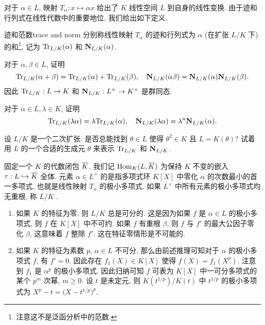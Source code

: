 对于 $\alpha\in L$, 映射 $T_\alpha:x\mapsto \alpha x$ 给出了 $K$ 线性空间 $L$ 到自身的线性变换.
由于迹和行列式在线性代数中的重要地位, 我们给出如下定义.

\begin{definition}{迹和范数}{trace and norm}
分别称线性映射 $T_\alpha$ 的迹和行列式为 $\alpha$ (在扩张 $L/K$ 下)的和\footnote{注意这不是泛函分析中的范数.}, 记为 ${\mathrm{Tr}}_{L/K}(\alpha)$ 和 ${\mathbf{N}}_{L/K}(\alpha)$.
\end{definition}

\begin{exercise}
对于 $\alpha,\beta\in L$, 证明
	\[{\mathrm{Tr}}_{L/K}(\alpha+\beta)={\mathrm{Tr}}_{L/K}(\alpha)+{\mathrm{Tr}}_{L/K}(\beta),\quad
	{\mathbf{N}}_{L/K}(\alpha\beta)={\mathbf{N}}_{L/K}(\alpha){\mathbf{N}}_{L/K}(\beta).\]
因此 ${\mathrm{Tr}}_{L/K}:L\to K$ 和 ${\mathbf{N}}_{L/K}:L^\times\to K^\times$ 是群同态.
\end{exercise}

\begin{exercise}
对于 $\alpha\in L,\lambda\in K$, 证明
	\[{\mathrm{Tr}}_{L/K}(\lambda\alpha)=\lambda{\mathrm{Tr}}_{L/K}(\alpha),\quad
	{\mathbf{N}}_{L/K}(\lambda\alpha)=\lambda^n{\mathbf{N}}_{L/K}(\alpha).\]
\end{exercise}

\begin{exercise}
设 $L/K$ 是一个二次扩张. 是否总能找到 $\theta\in L$ 使得 $\theta^2\in K$ 且 $L=K(\theta)$? 试着用 $L$ 的一个合适的生成元 $\theta$ 来表示 ${\mathrm{Tr}}_{L/K}$ 和 ${\mathbf{N}}_{L/K}$.
\end{exercise}

固定一个 $K$ 的代数闭包 $\overline K$. 我们记 ${\mathrm{Hom}}_K(L,\overline K)$ 为保持 $K$ 不变的嵌入 $\tau:L\hookrightarrow\overline K$ 全体. 元素 $\alpha\in L^\times$ 的是指多项式环 $K[X]$ 中零化 $\alpha$ 的次数最小的首一多项式, 也就是线性映射 $T_\alpha$ 的极小多项式. 如果 $L^\times$ 中所有元素的极小多项式均无重根, 称 $L/K$ . 
\begin{example}
	\begin{enumerate}
		\item 如果 $K$ 的特征为零, 则 $L/K$ 总是可分的. 这是因为如果 $f$ 是 $\alpha\in L$ 的极小多项式, 则 $f$ 在 $K[X]$ 中不可约. 如果 $f$ 有重根 $\beta$, 则 $f$ 与 $f'$ 的最大公因子零化 $\beta$, 这意味着 $f$ 整除 $f'$. 这在特征零情形是不可能的.
		\item 如果 $K$ 的特征为素数 $p$, $\alpha\in L$ 不可分, 那么由前述推理可知对于 $\alpha$ 的极小多项式 $f$, 有 $f'=0$. 因此存在 $f_1(X)\in K[X]$ 使得 $f(X)=f_1(X^p)$.
		注意到 $f_1$ 是 $\alpha^p$ 的极小多项式. 因此归纳可知 $f$ 可表为 $K[X]$ 中一可分多项式的某个 $p^m$ 次幂, $m\ge 0$.
		设 $t$ 是未定元, 则 $K(t^{1/p})/K(t)$ 中 $t^{1/p}$ 的极小多项式为 $X^p-t=\bigl(X-t^{1/p}\bigr)^p$.
	\end{enumerate}
\end{example}

